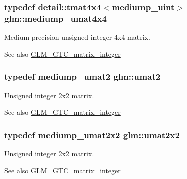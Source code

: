 \subsubsection[{mediump\+\_\+umat4x4}]{\setlength{\rightskip}{0pt plus 5cm}typedef detail\+::tmat4x4$<$mediump\+\_\+uint$>$ {\bf glm\+::mediump\+\_\+umat4x4}}\label{group__gtc__matrix__integer_ga27a135717a6c01fc900a8f10862718ac}
Medium-\/precision unsigned integer 4x4 matrix. \begin{DoxySeeAlso}{See also}
\hyperlink{group__gtc__matrix__integer}{G\+L\+M\+\_\+\+G\+T\+C\+\_\+matrix\+\_\+integer} 
\end{DoxySeeAlso}
\hypertarget{group__gtc__matrix__integer_gae2d45c058cfa0b60ab4df0cdda2d8516}{}
\subsubsection[{umat2}]{\setlength{\rightskip}{0pt plus 5cm}typedef mediump\+\_\+umat2 {\bf glm\+::umat2}}\label{group__gtc__matrix__integer_gae2d45c058cfa0b60ab4df0cdda2d8516}
Unsigned integer 2x2 matrix. \begin{DoxySeeAlso}{See also}
\hyperlink{group__gtc__matrix__integer}{G\+L\+M\+\_\+\+G\+T\+C\+\_\+matrix\+\_\+integer} 
\end{DoxySeeAlso}
\hypertarget{group__gtc__matrix__integer_gad3c997b31dd69bdb4787867e758ed48d}{}
\subsubsection[{umat2x2}]{\setlength{\rightskip}{0pt plus 5cm}typedef mediump\+\_\+umat2x2 {\bf glm\+::umat2x2}}\label{group__gtc__matrix__integer_gad3c997b31dd69bdb4787867e758ed48d}
Unsigned integer 2x2 matrix. \begin{DoxySeeAlso}{See also}
\hyperlink{group__gtc__matrix__integer}{G\+L\+M\+\_\+\+G\+T\+C\+\_\+matrix\+\_\+integer} 
\end{DoxySeeAlso}
\hypertarget{group__gtc__matrix__integer_ga890ae28f9230794138b2c89f44ce3376}{}
